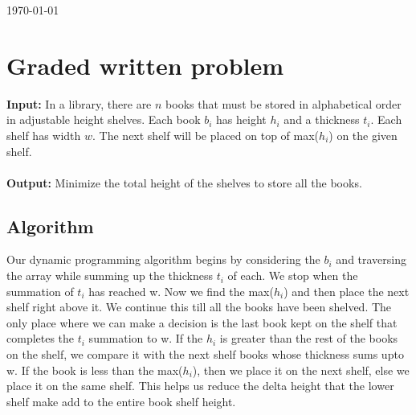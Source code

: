 \documentclass[8pt]{article}
\begin{document}
\hfill \small{\today} \\
\setlength{\fboxrule}{.5mm}\setlength{\fboxsep}{1.2mm}
\newlength{\boxlength}\setlength{\boxlength}{\textwidth}
\addtolength{\boxlength}{-4mm}
\begin{center}\end{center}
\vspace{5mm}

\section{Graded written problem}

\textbf{Input:} In a library, there are $n$ books that must be stored in alphabetical order in adjustable height shelves. Each book $b_i$ has height $h_i$ and a thickness $t_i$. Each shelf has width $w$. The next shelf will be placed on top of max($h_i$) on the given shelf.
\\ \\
\textbf{Output:} Minimize the total height of the shelves to store all the books.

\subsection{Algorithm}
Our dynamic programming algorithm begins by considering the $b_i$ and traversing the array while summing up the thickness $t_i$ of each. We stop when the summation of $t_i$ has reached w. Now we find the max($h_i$) and then place the next shelf right above it. We continue this till all the books have been shelved. The only place where we can make a decision is the last book kept on the shelf that completes the $t_i$ summation to w. If the $h_i$ is greater than the rest of the books on the shelf, we compare it with the next shelf books whose thickness sums upto w. If the book is less than the max($h_i$), then we place it on the next shelf, else we place it on the same shelf. This helps us reduce the delta height that the lower shelf make add to the entire book shelf height.
\end{document}
